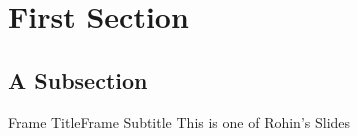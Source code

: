 \section{First Section}

\subsection{A Subsection}
	\begin{frame}{Frame Title}{Frame Subtitle}
		This is one of Rohin's Slides
	\end{frame}